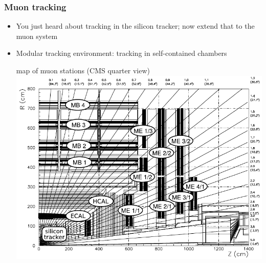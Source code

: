 \documentclass[compress]{beamer}
\begin{document}
\begin{frame}
\frametitle{Muon tracking}
\begin{itemize}
\item You just heard about tracking in the silicon tracker; now extend that to the muon system
\item Modular tracking environment: tracking in self-contained chambers

\begin{center}
map of muon stations (CMS quarter view)
\includegraphics[width=0.8\linewidth]{muon_system_labeled.pdf}
\end{center}
\end{itemize}
\end{frame}
\end{document}
